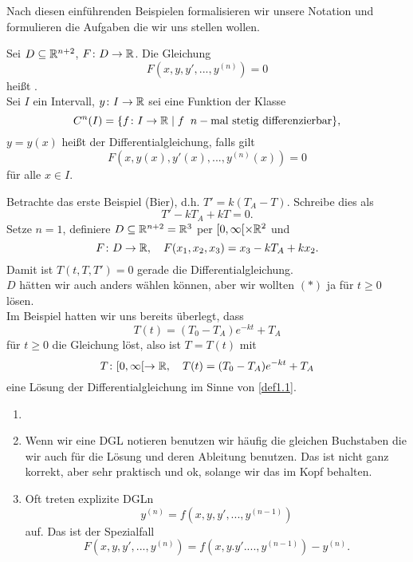 Nach diesen einf\"uhrenden Beispielen formalisieren wir unsere Notation und formulieren die Aufgaben die wir uns stellen wollen.\\
\begin{definition}
	Sei $ D\subseteq \mathbb{R}^{n+2} $, $ F\colon D\rightarrow\mathbb{R} $. Die Gleichung
	\[ F(x,y,y',...,y^{(n)})=0 \]
	hei\ss t .\\
	Sei $ I $ ein Intervall, $ y\colon I\rightarrow\mathbb{R} $ sei eine Funktion der Klasse \[ C^n(I)=\lbrace f\colon I\rightarrow\mathbb{R}\mid f\;\;n-\text{mal stetig differenzierbar}\rbrace, \]
	$ y=y(x) $ hei\ss t  der Differentialgleichung, falls gilt
	\[ F(x,y(x),y'(x),...,y^{(n)}(x))=0 \]
	f\"ur alle $ x\in I $.
\end{definition}
\begin{beispiel}
	Betrachte das erste Beispiel (Bier), d.h. $ T'=k(T_A-T) $. Schreibe dies als \[ T'-kT_A+kT =0.\] Setze $ n=1 $, definiere $ D\subseteq\mathbb{R}^{n+2}=\mathbb{R}^3 $ per $ [0,\infty[\times\mathbb{R}^2 $ und
	\[ F\colon D\rightarrow\mathbb{R},\quad F(x_1,x_2,x_3)=x_3-kT_A+kx_2. \]
	Damit ist $ T(t,T,T')=0 $ gerade die Differentialgleichung.\\
	$ D $ h\"atten wir auch anders w\"ahlen k\"onnen, aber wir wollten $ (\ast) $ ja f\"ur $ t\geq 0 $ l\"osen.\\
	Im Beispiel hatten wir uns bereits \"uberlegt, dass
	\[ T(t)=(T_0-T_A)e^{-kt}+T_A \]
	f\"ur $ t\geq 0 $ die Gleichung l\"ost, also ist $ T=T(t) $ mit
	\[ T\colon [0,\infty[\rightarrow\mathbb{R},\quad T(t)=(T_0-T_A)e^{-kt}+T_A \]
	eine L\"osung der Differentialgleichung im Sinne von \ref{def1.1}.  
\end{beispiel}
\begin{bemerkung}
	\begin{enumerate}
		\item[]
		\item Wenn wir eine DGL notieren benutzen wir h\"aufig die gleichen Buchstaben die wir auch f\"ur die L\"osung und deren Ableitung benutzen. Das ist nicht ganz korrekt, aber sehr praktisch und ok, solange wir das im Kopf behalten.
		\item Oft treten explizite DGLn
		\[ y^{(n)}=f(x,y,y',...,y^{(n-1)}) \]
		auf. Das ist der Spezialfall
		\[ F(x,y,y',...,y^{(n)})=f(x,y.y'....,y^{(n-1)})-y^{(n)}. \]
	\end{enumerate}
\end{bemerkung}
